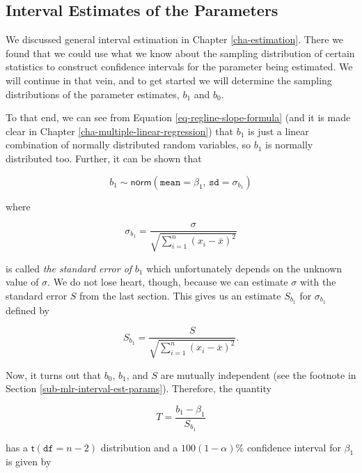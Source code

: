 \documentclass[]{book}
\numberwithin{equation}{chapter}
\numberwithin{figure}{chapter}
\theoremstyle{plain}
\theoremstyle{definition}
\theoremstyle{remark}
\theoremstyle{definition}
\theoremstyle{definition}
\theoremstyle{remark}
\begin{document}
\subsection{Interval Estimates of the
Parameters}\label{sub-slr-interval-est-params}

We discussed general interval estimation in Chapter
\ref{cha-estimation}. There we found that we could use what we know
about the sampling distribution of certain statistics to construct
confidence intervals for the parameter being estimated. We will continue
in that vein, and to get started we will determine the sampling
distributions of the parameter estimates, \(b_{1}\) and \(b_{0}\).

To that end, we can see from Equation \eqref{eq-regline-slope-formula}
(and it is made clear in Chapter \ref{cha-multiple-linear-regression})
that \(b_{1}\) is just a linear combination of normally distributed
random variables, so \(b_{1}\) is normally distributed too. Further, it
can be shown that

\begin{equation}
b_{1}\sim\mathsf{norm}\left(\mathtt{mean}=\beta_{1},\,\mathtt{sd}=\sigma_{b_{1}}\right)
\end{equation}

where

\begin{equation}
\sigma_{b_{1}}=\frac{\sigma}{\sqrt{\sum_{i=1}^{n}(x_{i}-\overline{x})^{2}}}
\end{equation}

is called \emph{the standard error of} \(b_{1}\) which unfortunately
depends on the unknown value of \(\sigma\). We do not lose heart,
though, because we can estimate \(\sigma\) with the standard error \(S\)
from the last section. This gives us an estimate \(S_{b_{1}}\) for
\(\sigma_{b_{1}}\) defined by

\begin{equation}
S_{b_{1}}=\frac{S}{\sqrt{\sum_{i=1}^{n}(x_{i}-\overline{x})^{2}}}.
\end{equation}

Now, it turns out that \(b_{0}\), \(b_{1}\), and \(S\) are mutually
independent (see the footnote in Section
\ref{sub-mlr-interval-est-params}). Therefore, the quantity

\begin{equation}
T=\frac{b_{1}-\beta_{1}}{S_{b_{1}}}
\end{equation}

has a \(\mathsf{t}(\mathtt{df}=n-2)\) distribution and a
\(100(1-\alpha)\%\) confidence interval for \(\beta_{1}\) is given by
\end{document}
